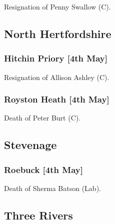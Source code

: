 \documentclass[a4paper,openany]{book}
\begin{document}
\begin{resultsiii}

Resignation of Penny Swallow (C).

\subsection*{North Hertfordshire}

\subsubsection*{Hitchin Priory \hspace*{\fill}\nolinebreak[1]%
\enspace\hspace*{\fill}
[4th May]}


Resignation of Allison Ashley (C).

\subsubsection*{Royston Heath \hspace*{\fill}\nolinebreak[1]%
\enspace\hspace*{\fill}
[4th May]}


Death of Peter Burt (C).

\subsection*{Stevenage}

\subsubsection*{Roebuck \hspace*{\fill}\nolinebreak[1]%
\enspace\hspace*{\fill}
[4th May]}


Death of Sherma Batson (Lab).

\subsection*{Three Rivers}


\end{resultsiii}
\end{document}
